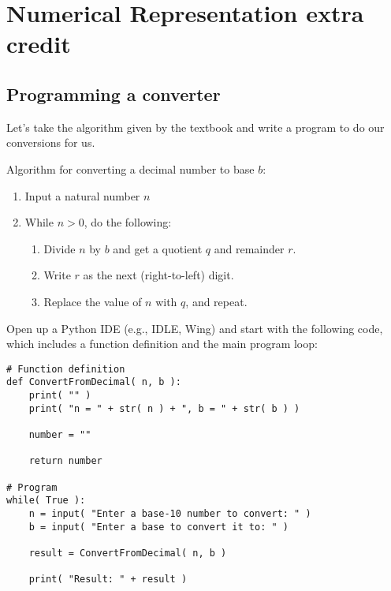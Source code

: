 \documentclass[a4paper,12pt]{book}
\title{}
\author{Rachel Morris}
\date{\today}
\begin{document}
    \togglefalse{answerkey}


    \section{Numerical Representation extra credit}

    \subsection{Programming a converter}

        Let's take the algorithm given by the textbook and write
        a program to do our conversions for us.
    
            \begin{intro}{Algorithm for converting a decimal number to base $b$:}
                \begin{enumerate}
                    \item   Input a natural number $n$
                    \item   While $n > 0$, do the following:
                        \begin{enumerate}
                            \item   Divide $n$ by $b$ and get a quotient $q$ and remainder $r$.
                            \item   Write $r$ as the next (right-to-left) digit.
                            \item   Replace the value of $n$ with $q$, and repeat.
                        \end{enumerate}
                \end{enumerate}
            \end{intro}

        Open up a Python IDE (e.g., IDLE, Wing) and start with the following code,
        which includes a function definition and the main program loop:

\begin{lstlisting}[style=pycode]
# Function definition
def ConvertFromDecimal( n, b ):
    print( "" )
    print( "n = " + str( n ) + ", b = " + str( b ) )

    number = ""

    return number

# Program
while( True ):
    n = input( "Enter a base-10 number to convert: " )
    b = input( "Enter a base to convert it to: " )

    result = ConvertFromDecimal( n, b )

    print( "Result: " + result )
\end{lstlisting}
\end{document}
